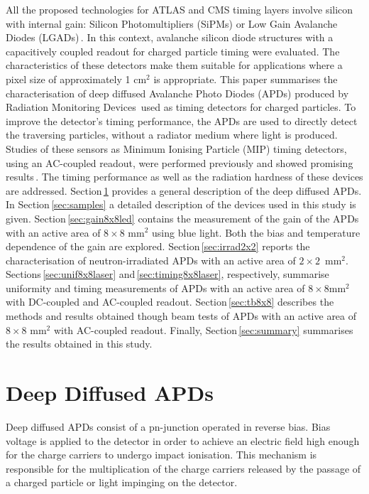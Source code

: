 \documentclass[3p,preprint,twocolumn]{elsarticle}
\begin{document}
All the proposed technologies for ATLAS and CMS timing layers involve silicon with internal gain: Silicon Photomultipliers (SiPMs) or Low Gain Avalanche Diodes (LGADs)\,\cite{cmsMIPtiming,atlasMIPtiming}.
In this context, avalanche silicon diode structures with a capacitively coupled readout for charged particle timing were evaluated.
The characteristics of these detectors make them suitable for applications where a pixel size of approximately 1 cm$^{2}$ is appropriate.
This paper summarises the characterisation of deep diffused Avalanche Photo Diodes (APDs) produced by Radiation Monitoring Devices\,\cite{rmdAddress} used as timing detectors for charged particles.
To improve the detector's timing performance, the APDs are used to directly detect the traversing particles, without a radiator medium where light is produced.
Studies of these sensors as Minimum Ionising Particle (MIP) timing detectors, using an AC-coupled readout, were performed previously and showed promising results\,\cite{white2014}.
The timing performance as well as the radiation hardness of these devices are addressed.
Section\,\ref{sec:ddApds} provides a general description of the deep diffused APDs.
In Section\,\ref{sec:samples} a detailed description of the devices used in this study is given.
Section\,\ref{sec:gain8x8led} contains the measurement of the gain of the APDs with an active area of $8 \times 8$ mm$^2$ using blue light. Both the bias and temperature dependence of the gain are explored.
Section\,\ref{sec:irrad2x2} reports the characterisation of neutron-irradiated APDs with an active area of $2 \times 2$~mm$^2$.
Sections\,\ref{sec:unif8x8laser} and\,\ref{sec:timing8x8laser}, respectively, summarise uniformity and timing measurements of APDs with an active area of $8 \times 8$mm$^2$ with DC-coupled and AC-coupled readout.
Section\,\ref{sec:tb8x8} describes the methods and results obtained though beam tests of APDs with an active area of $8 \times 8$ mm$^2$ with AC-coupled readout.
Finally, Section\,\ref{sec:summary} summarises the results obtained in this study.


\section{Deep Diffused APDs}
\label{sec:ddApds}

Deep diffused APDs consist of a pn-junction operated in reverse bias.
Bias voltage is applied to the detector in order to achieve an electric field high enough for the charge carriers to undergo impact ionisation.
This mechanism is responsible for the multiplication of the charge carriers released by the passage of a charged particle or light impinging on the detector.
\end{document}
